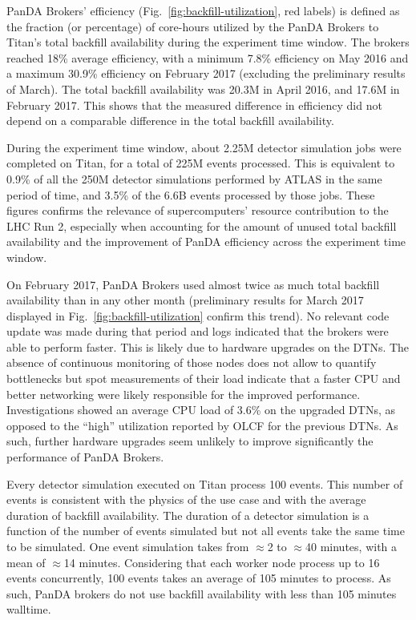 PanDA Brokers' efficiency (Fig.~\ref{fig:backfill-utilization}, red labels) is
defined as the fraction (or percentage) of core-hours utilized by the PanDA
Brokers to Titan’s total backfill availability during the experiment time
window. The brokers reached 18\% average efficiency, with a minimum 7.8\%
efficiency on May 2016 and a maximum 30.9\% efficiency on February 2017
(excluding the preliminary results of March). The total backfill availability
was 20.3M in April 2016, and 17.6M in February 2017. This shows that the
measured difference in efficiency did not depend on a comparable difference in
the total backfill availability.

During the experiment time window, about 2.25M detector simulation jobs were
completed on Titan, for a total of 225M events processed. This is equivalent
to 0.9\% of all the 250M detector simulations performed by ATLAS in the same
period of time, and 3.5\% of the 6.6B events processed by those jobs. These
figures confirms the relevance of supercomputers' resource contribution to
the LHC Run 2, especially when accounting for the amount of unused total
backfill availability and the improvement of PanDA efficiency across the
experiment time window.

On February 2017, PanDA Brokers used almost twice as much total backfill
availability than in any other month (preliminary results for March 2017
displayed in Fig.~\ref{fig:backfill-utilization} confirm this trend). No
relevant code update was made during that period and logs indicated that the
brokers were able to perform faster. This is likely due to hardware upgrades
on the DTNs. The absence of continuous monitoring of those nodes does not
allow to quantify bottlenecks but spot measurements of their load indicate
that a faster CPU and better networking were likely responsible for the
improved performance. Investigations showed an average CPU load of 3.6\% on
the upgraded DTNs, as opposed to the ``high'' utilization reported by OLCF
for the previous DTNs. As such, further hardware upgrades seem unlikely to
improve significantly the performance of PanDA Brokers.

Every detector simulation executed on Titan process 100 events. This number
of events is consistent with the physics of the use case and with the average
duration of backfill availability. The duration of a detector simulation is a
function of the number of events simulated but not all events take the same
time to be simulated. One event simulation takes from $\approx$2 to
$\approx$40 minutes, with a mean of $\approx$14 minutes. Considering that
each worker node process up to 16 events concurrently, 100 events takes an
average of 105 minutes to process. As such, PanDA brokers do not use backfill
availability with less than 105 minutes walltime.

